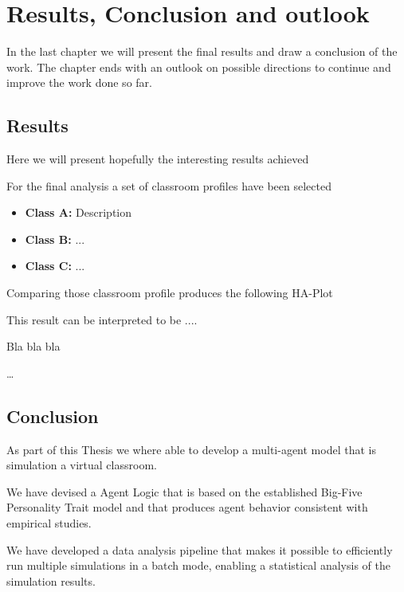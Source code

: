 \chapter{Results, Conclusion and outlook}
In the last chapter we will present the final results and draw a conclusion of the work.
The chapter ends with an outlook on possible directions to continue and improve
the work done so far.

\section{Results}
Here we will present hopefully the interesting results achieved

For the final analysis a set of classroom profiles have been selected

\begin{itemize}
    \item \textbf{Class A:} Description
    \item \textbf{Class B:} ...
    \item \textbf{Class C:} ...
\end{itemize}

Comparing those classroom profile produces the following HA-Plot

\begin{figure}[H]
\end{figure}

This result can be interpreted to be ....

Bla bla bla

\dots


\section{Conclusion}
As part of this Thesis we where able to develop a multi-agent model that is simulation
a virtual classroom.

We have devised a Agent Logic that is based on the established Big-Five Personality
Trait model and that produces agent behavior consistent with empirical studies.

We have developed a data analysis pipeline that makes it possible to efficiently
run multiple simulations in a batch mode, enabling a statistical analysis of the
simulation results.

